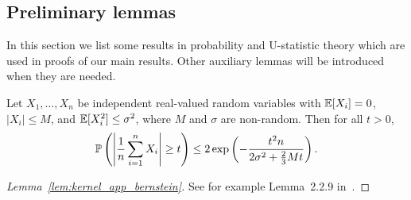 \subsection{Preliminary lemmas}

In this section we list some results
in probability and U-statistic theory
which are used in proofs of our main results.
Other auxiliary lemmas will be introduced when
they are needed.

\begin{lemma}
  \label{lem:kernel_app_bernstein}

  Let $X_1, \ldots, X_n$ be independent real-valued
  random variables with
  $\E[X_i] = 0$, $|X_i| \leq M$, and
  $\E[X_i^2] \leq \sigma^2$,
  where $M$ and $\sigma$ are non-random.
  Then for all $t>0$,
  \begin{align*}
    \P \left(
      \left| \frac{1}{n} \sum_{i=1}^n X_i \right| \geq t
    \right)
    \leq 2 \exp \left( -
      \frac{t^2 n}
      {2 \sigma^2 + \frac{2}{3} M t}
    \right).
  \end{align*}

\end{lemma}

\begin{proof}[Lemma~\ref{lem:kernel_app_bernstein}]

  See for example
  Lemma~2.2.9 in~\citet{van1996weak}.
\end{proof}

